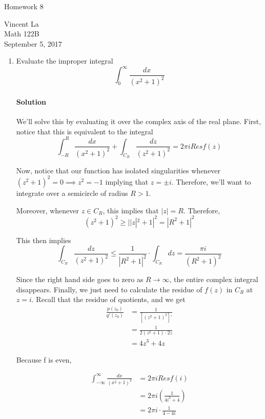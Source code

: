 \documentclass[11pt]{article}
\title{ }
\begin{document}
	\begin{center}	%
		\Large{Homework 8}	%
	\end{center}
	\begin{center}
		Vincent La \\
		Math 122B \\
		September 5, 2017
	\end{center}
	
\begin{enumerate}
	\item Evaluate the improper integral \[\int_0^\infty \frac{dx}{(x^2 + 1)^2} \]
	\paragraph{Solution}
	We'll solve this by evaluating it over the complex axis of the real plane. First, notice that this is equivalent to the integral 
	\[
	\int^R_{-R} \frac{dx}{(x^2 + 1)^2} + \int_{C_R} \frac{dz}{(z^2 + 1)^2} = 2\pi i Res f(z)
	\]
	
	Now, notice that our function has isolated singularities whenever $(z^2 + 1)^2 = 0 \implies z^2 = -1$ implying that $z = \pm i$. Therefore, we'll want to integrate over a semicircle of radius $R > 1$.
	
	\bigskip
	
	Moreover, whenever $z \in C_R$, this implies that $|z| = R$. Therefore, 
	\[(z^2 + 1)^2 \geq ||z|^2 + 1|^2 = |R^2 + 1|^2 \]
	
	This then implies
	\[\int_{C_R} \frac{dz}{(z^2 + 1)^2} \leq \frac{1}{|R^2 + 1|^2}  \cdot 
      \int_{C_R} dz = \frac{\pi i}{(R^2 + 1)^2}\]
      
    Since the right hand side goes to zero as $R \rightarrow \infty$, the entire complex integral disappears. Finally, we just need to calculate the residue of $f(z)$ in $C_R$ at $z = i$. Recall that the residue of quotients, and we get
    \[\begin{aligned}
	\frac{p(z_0)}{q'(z_0)}
	&= \frac{1}{[(z^2 + 1)^2]'} \\
	&= \frac{1}{2(z^2 + 1) \cdot 2z} \\
	&= 4z^3 + 4z
    \end{aligned}\]
    
    Because f is even,
    
    \[\begin{aligned}
    \int^\infty_{-\infty} \frac{dx}{(x^2 + 1)^2}
    &= 2\pi i Res f(i) \\
    &= 2\pi i(\frac{1}{4i^3 + 4})  \\
    &= 2\pi i \cdot \frac{1}{4 - 4i}
    \end{aligned}\]
	

\end{enumerate}
\end{document}
